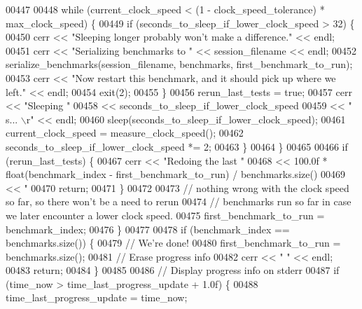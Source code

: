 \begin{DoxyCode}
{{{{00447 
00448         \textcolor{keywordflow}{while} (current\_clock\_speed < (1 - clock\_speed\_tolerance) * max\_clock\_speed) \{
00449           \textcolor{keywordflow}{if} (seconds\_to\_sleep\_if\_lower\_clock\_speed > 32) \{
00450             cerr << \textcolor{stringliteral}{"Sleeping longer probably won't make a difference."} << endl;
00451             cerr << \textcolor{stringliteral}{"Serializing benchmarks to "} << session\_filename << endl;
00452             serialize\_benchmarks(session\_filename, benchmarks, first\_benchmark\_to\_run);
00453             cerr << \textcolor{stringliteral}{"Now restart this benchmark, and it should pick up where we left."} << endl;
00454             exit(2);
00455           \}
00456           rerun\_last\_tests = \textcolor{keyword}{true};
00457           cerr << \textcolor{stringliteral}{"Sleeping "}
00458                << seconds\_to\_sleep\_if\_lower\_clock\_speed
00459                << \textcolor{stringliteral}{" s...                                   \(\backslash\)r"} << endl;
00460           sleep(seconds\_to\_sleep\_if\_lower\_clock\_speed);
00461           current\_clock\_speed = measure\_clock\_speed();
00462           seconds\_to\_sleep\_if\_lower\_clock\_speed *= 2;
00463         \}
00464       \}
00465 
00466       \textcolor{keywordflow}{if} (rerun\_last\_tests) \{
00467         cerr << \textcolor{stringliteral}{"Redoing the last "}
00468              << 100.0f * float(benchmark\_index - first\_benchmark\_to\_run) / benchmarks.size()
00469              << \textcolor{stringliteral}{" %
00470         \textcolor{keywordflow}{return};
00471       \}
00472 
00473       \textcolor{comment}{// nothing wrong with the clock speed so far, so there won't be a need to rerun}
00474       \textcolor{comment}{// benchmarks run so far in case we later encounter a lower clock speed.}
00475       first\_benchmark\_to\_run = benchmark\_index;
00476     \}
00477 
00478     \textcolor{keywordflow}{if} (benchmark\_index == benchmarks.size()) \{
00479       \textcolor{comment}{// We're done!}
00480       first\_benchmark\_to\_run = benchmarks.size();
00481       \textcolor{comment}{// Erase progress info}
00482       cerr << \textcolor{stringliteral}{"                                                            "} << endl;
00483       \textcolor{keywordflow}{return};
00484     \}
00485 
00486     \textcolor{comment}{// Display progress info on stderr}
00487     \textcolor{keywordflow}{if} (time\_now > time\_last\_progress\_update + 1.0f) \{
00488       time\_last\_progress\_update = time\_now;
}}}}}
\end{DoxyCode}
